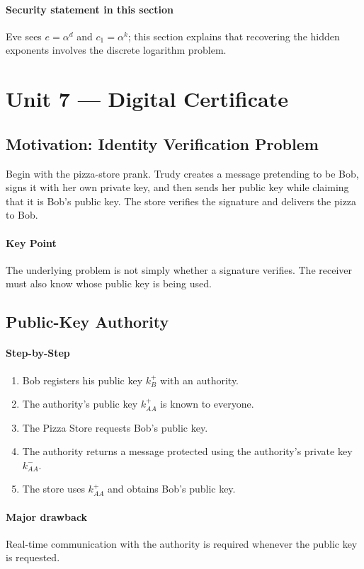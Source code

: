 \documentclass[12pt]{article}
\newcommand{\Step}{\paragraph{Step-by-Step}}
\newcommand{\KeyPoint}{\paragraph{Key Point}}
\begin{document}
\paragraph{Security statement in this section}
Eve sees $e=\alpha^d$ and $c_1=\alpha^k$; this section explains that recovering the hidden exponents involves the discrete logarithm problem.

\newpage
\section{Unit 7 --- Digital Certificate}

\subsection{Motivation: Identity Verification Problem}
Begin with the pizza-store prank. Trudy creates a message pretending to be Bob, signs it with her own private key, and then sends her public key while claiming that it is Bob's public key. The store verifies the signature and delivers the pizza to Bob.

\KeyPoint The underlying problem is not simply whether a signature verifies. The receiver must also know whose public key is being used.

\subsection{Public-Key Authority}
\Step
\begin{enumerate}
    \item Bob registers his public key $k_B^+$ with an authority.
    \item The authority's public key $k_{AA}^+$ is known to everyone.
    \item The Pizza Store requests Bob's public key.
    \item The authority returns a message protected using the authority's private key $k_{AA}^-$.
    \item The store uses $k_{AA}^+$ and obtains Bob's public key.
\end{enumerate}

\paragraph{Major drawback}
Real-time communication with the authority is required whenever the public key is requested.
\end{document}
